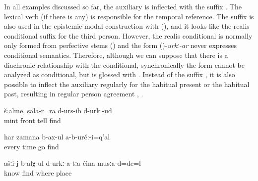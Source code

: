 In all examples discussed so far, the auxiliary is inflected with the suffix  . The lexical verb (if there is any) is responsible for the temporal reference. The suffix  is also used in the epistemic modal construction with  (), and it looks like the realis conditional suffix for the third person. However, the realis conditional is normally only formed from perfective stems () and the form ()-\textit{urkː-ar} never expresses conditional semantics. Therefore, although we can suppose that there is a diachronic relationship with the conditional, synchronically the form cannot be analyzed as conditional, but is glossed with . Instead of the suffix , it is also possible to inflect the auxiliary regularly for the habitual present  or the habitual past, resulting in regular person agreement  , .
%
\begin{exe}
	\ex	\label{ex:‎(It is made from) mint; I probably also told it (= how to make it) the last time}
	\gll	šːalme,	sala-r=ra	d-urs-ib	d-urkː-ud\\
		mint	front	tell	find\\
	\glt	{}
	
	\ex	\label{ex:‎‎Probably they did not always go (to drink milk)}
	\gll	har	zamana	b-ax-ul	a-b-určː-i=q'al\\
		every	time	go	find\\
	\glt	{}

	\ex	\label{ex:You should know / you probably know, where (in which place) they (the berries) were}
	\gll	ašːi-j	b-alχ-ul	d-urkː-a-tːa	čina	musːa-d=de=l\\
			know	find	where	place\\
	\glt	{}
\end{exe}


